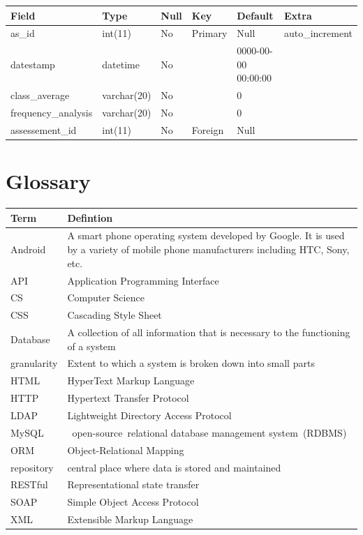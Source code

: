 \documentclass[12pt]{article}
\begin{document}
					
					\begin{tabular}{|p{1.0in}|p{1.0in}|p{0.4in}|p{0.4in}|p{1.0in}|p{1.1in}|} \hline
					Field & Type & Null & Key & Default & Extra \\ \hline
					as\_id & int(11) & No & Primary & Null & auto\_increment \\ \hline
					datestamp & datetime & No &  & 0000-00-00 00:00:00 &  \\ \hline
					class\_average & varchar(20) & No &  & 0 &  \\ \hline
					frequency\_analysis & varchar(20) & No &  & 0 &  \\ \hline
					assessement\_id & int(11) & No & Foreign & Null &  \\ \hline
					\end{tabular}
				\vspace{0.2in}
			
			
	
	
		
		
	\newpage
	\section{Glossary}
		\begin{tabular}{|p{2.1in}|p{2.2in}|} \hline 
			Term & Defintion \\ \hline 
			Android & A smart phone operating system developed by Google. It is used by a variety of mobile phone manufacturers including HTC, Sony, etc. \newline  \\ \hline 
			API & Application Programming Interface \\ \hline 
			CS & Computer Science \\ \hline 
			CSS & Cascading Style Sheet \\ \hline 
			Database & A collection of all information that is necessary to the functioning of a system \\ \hline 
			granularity & Extent to which a system is broken down into small parts \\ \hline 
			HTML & HyperText Markup Language \\ \hline 
			HTTP & Hypertext Transfer Protocol \\ \hline 
			LDAP & Lightweight Directory Access Protocol \newline  \\ \hline 
			MySQL & ~open-source~relational database management system~(RDBMS) \\ \hline 
			ORM & Object-Relational Mapping \\ \hline 
			repository & central place where data is stored and maintained \\ \hline 
			RESTful & Representational state transfer \\ \hline 
			SOAP & Simple Object Access Protocol \newline  \\ \hline 
			XML & Extensible Markup Language \\ \hline 
		\end{tabular}

		\vspace{0.2in}
		
			
	
	
\end{document}
